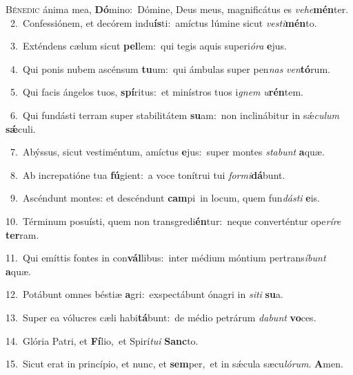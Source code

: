 \lettrine{\initial\textcolor{\initialcolor}{B}}{énedic} ánima mea, \textbf{Dó}\-mino:~\star Dómine, Deus meus, magnificátus es \textit{ve}\-\textit{he}\textbf{mén}ter.\\
{\numbfont\textcolor{\numbcolor}{~2.}}~Confessiónem, et decórem indu\-\textbf{ís}\-ti:~\star amíctus lúmine sicut \textit{ves}\-\textit{ti}\textbf{mén}to.\par
{\numbfont\textcolor{\numbcolor}{~3.}}~Exténdens cælum sicut \textbf{pel}\-lem:~\star qui tegis aquis superi\-\textit{ó}\-\textit{ra} \textbf{e}\-jus.\par
{\numbfont\textcolor{\numbcolor}{~4.}}~Qui ponis nubem ascénsum \textbf{tu}\-um:~\star qui ámbulas super pen\textit{nas} \textit{ven}\-\textbf{tó}rum.\par
{\numbfont\textcolor{\numbcolor}{~5.}}~Qui facis ángelos tuos, \textbf{spí}\-ritus:~\star et minístros tuos i\textit{gnem} \textit{u}\-\textbf{rén}tem.\par
{\numbfont\textcolor{\numbcolor}{~6.}}~Qui fundásti terram super stabilitátem \textbf{su}\-am:~\star non inclinábitur in sǽ\-\textit{cu}\-\textit{lum} \textbf{sǽ}\-culi.\par
{\numbfont\textcolor{\numbcolor}{~7.}}~Abýssus, sicut vestiméntum, amíctus \textbf{e}\-jus:~\star super montes \textit{sta}\-\textit{bunt} \textbf{a}\-quæ.\par
{\numbfont\textcolor{\numbcolor}{~8.}}~Ab increpatióne tua \textbf{fú}\-gient:~\star a voce tonítrui tui \textit{for}\-\textit{mi}\textbf{dá}bunt.\par
{\numbfont\textcolor{\numbcolor}{~9.}}~Ascéndunt montes: et descéndunt \textbf{cam}\-pi~\star in locum, quem fun\-\textit{dás}\-\textit{ti} \textbf{e}\-is.\par
{\numbfont\textcolor{\numbcolor}{10.}}~Términum posuísti, quem non transgredi\-\textbf{én}\-tur:~\star neque converténtur ope\-\textit{rí}\-\textit{re} \textbf{ter}\-ram.\par
{\numbfont\textcolor{\numbcolor}{11.}}~Qui emíttis fontes in con\-\textbf{vál}\-libus:~\star inter médium móntium pertrans\-\textit{í}\-\textit{bunt} \textbf{a}\-quæ.\par
{\numbfont\textcolor{\numbcolor}{12.}}~Potábunt omnes béstiæ \textbf{a}\-gri:~\star exspectábunt ónagri in \textit{si}\-\textit{ti} \textbf{su}\-a.\par
{\numbfont\textcolor{\numbcolor}{13.}}~Super ea vólucres cæli habi\-\textbf{tá}\-bunt:~\star de médio petrárum \textit{da}\-\textit{bunt} \textbf{vo}\-ces.\par
{\numbfont\textcolor{\numbcolor}{14.}}~Glória Patri, et \textbf{Fí}\-lio,~\star et Spirí\-\textit{tu}\-\textit{i} \textbf{Sanc}\-to.\par
{\numbfont\textcolor{\numbcolor}{15.}}~Sicut erat in princípio, et nunc, et \textbf{sem}\-per,~\star et in sǽcula sæcu\-\textit{ló}\-\textit{rum}. \textbf{A}\-men.\par
